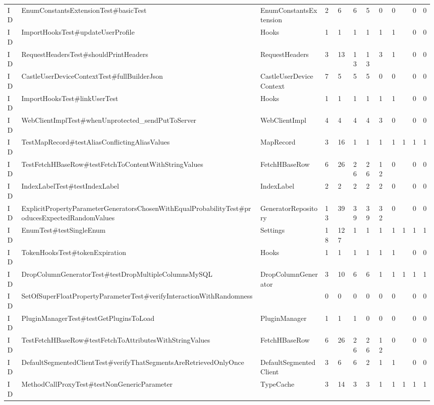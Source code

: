 \begin{table}[t]
\begin{tabular}{llllllllllll}
ID & EnumConstantsExtensionTest\#basicTest & EnumConstantsExtension & 2 & 6 & 6 & 5 & 0 & 0 &  & 0 & 0 \\
ID & ImportHooksTest\#updateUserProfile & Hooks & 1 & 1 & 1 & 1 & 1 & 1 &  & 0 & 0 \\
ID & RequestHeadersTest\#shouldPrintHeaders & RequestHeaders & 3 & 13 & 13 & 13 & 3 & 1 &  & 0 & 0 \\
ID & CastleUserDeviceContextTest\#fullBuilderJson & CastleUserDeviceContext & 7 & 5 & 5 & 5 & 0 & 0 &  & 0 & 0 \\
ID & ImportHooksTest\#linkUserTest & Hooks & 1 & 1 & 1 & 1 & 1 & 1 &  & 0 & 0 \\
ID & WebClientImplTest\#whenUnprotected\_sendPutToServer & WebClientImpl & 4 & 4 & 4 & 4 & 3 & 0 &  & 0 & 0 \\
ID & TestMapRecord\#testAliasConflictingAliasValues & MapRecord & 3 & 16 & 1 & 1 & 1 & 1 & 1 & 1 & 1 \\
ID & TestFetchHBaseRow\#testFetchToContentWithStringValues & FetchHBaseRow & 6 & 26 & 26 & 26 & 12 & 0 &  & 0 & 0 \\
ID & IndexLabelTest\#testIndexLabel & IndexLabel & 2 & 2 & 2 & 2 & 2 & 0 &  & 0 & 0 \\
ID & ExplicitPropertyParameterGeneratorsChosenWithEqualProbabilityTest\#producesExpectedRandomValues & GeneratorRepository & 13 & 39 & 39 & 39 & 32 & 0 &  & 0 & 0 \\
ID & EnumTest\#testSingleEnum & Settings & 18 & 127 & 1 & 1 & 1 & 1 & 1 & 1 & 1 \\
ID & TokenHooksTest\#tokenExpiration & Hooks & 1 & 1 & 1 & 1 & 1 & 1 &  & 0 & 0 \\
ID & DropColumnGeneratorTest\#testDropMultipleColumnsMySQL & DropColumnGenerator & 3 & 10 & 6 & 6 & 1 & 1 & 1 & 1 & 1 \\
ID & SetOfSuperFloatPropertyParameterTest\#verifyInteractionWithRandomness &  & 0 & 0 & 0 & 0 & 0 & 0 &  & 0 & 0 \\
ID & PluginManagerTest\#testGetPluginsToLoad & PluginManager & 1 & 1 & 1 & 0 & 0 & 0 &  & 0 & 0 \\
ID & TestFetchHBaseRow\#testFetchToAttributesWithStringValues & FetchHBaseRow & 6 & 26 & 26 & 26 & 12 & 0 &  & 0 & 0 \\
ID & DefaultSegmentedClientTest\#verifyThatSegmentsAreRetrievedOnlyOnce & DefaultSegmentedClient & 3 & 6 & 6 & 2 & 1 & 1 &  & 0 & 0 \\
ID & MethodCallProxyTest\#testNonGenericParameter & TypeCache & 3 & 14 & 3 & 3 & 1 & 1 & 1 & 1 & 1 \\

\end{tabular}
\end{table}
